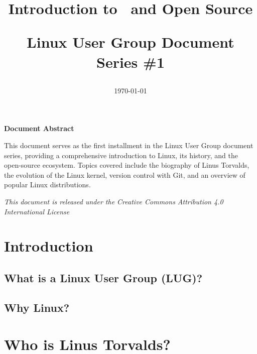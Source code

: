 \documentclass[12pt, a4paper, oneside]{article}
\title{
	\vspace{-2cm}
	\begin{flushleft}
		\Huge\bfseries\color{lugblue}
		Introduction to \linux\ and Open Source
	\end{flushleft}
	\vspace{-0.5cm}
	\begin{flushleft}
		\Large\color{lugdark}
		Linux User Group Document Series \#1
	\end{flushleft}
}
\date{\large\today}
\begin{document}
	
	\maketitle
	
	
	\begin{center}
		\colorbox{luglight}{
			\begin{minipage}{0.8\textwidth}
				\centering
				\vspace{0.5cm}
				\Large\textbf{Document Abstract}
				\vspace{0.3cm}
				
				\normalsize
				This document serves as the first installment in the Linux User Group document series, providing a comprehensive introduction to Linux, its history, and the open-source ecosystem. Topics covered include the biography of Linus Torvalds, the evolution of the Linux kernel, version control with Git, and an overview of popular Linux distributions.
				\vspace{0.5cm}
			\end{minipage}
		}
	\end{center}
	
	\vfill
	
	\begin{center}
		\small\textit{This document is released under the Creative Commons Attribution 4.0 International License}
	\end{center}
	
	\newpage
	
	\tableofcontents
	\newpage
	
	
	\section{Introduction}
	\subsection{What is a Linux User Group (LUG)?}
	\subsection{Why Linux?}
	
	\section{Who is Linus Torvalds?}
\end{document}
